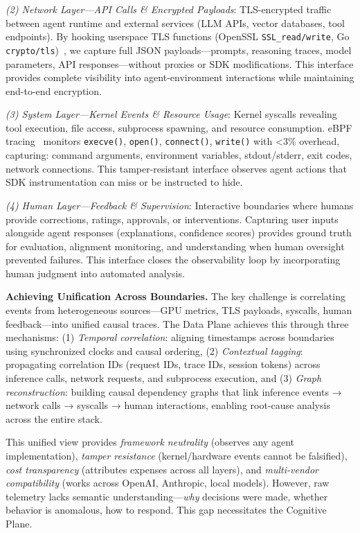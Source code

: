 \documentclass[sigplan,screen,9pt]{acmart}
\begin{document}
\emph{(2) Network Layer—API Calls \& Encrypted Payloads}: TLS-encrypted traffic between agent runtime and external services (LLM APIs, vector databases, tool endpoints). By hooking userspace TLS functions (OpenSSL \texttt{SSL\_read/write}, Go \texttt{crypto/tls})~\cite{zheng2025extending}, we capture full JSON payloads—prompts, reasoning traces, model parameters, API responses—without proxies or SDK modifications. This interface provides complete visibility into agent-environment interactions while maintaining end-to-end encryption.

\emph{(3) System Layer—Kernel Events \& Resource Usage}: Kernel syscalls revealing tool execution, file access, subprocess spawning, and resource consumption. eBPF tracing~\cite{brendangregg,ebpfio} monitors \texttt{execve()}, \texttt{open()}, \texttt{connect()}, \texttt{write()} with <3\% overhead, capturing: command arguments, environment variables, stdout/stderr, exit codes, network connections. This tamper-resistant interface observes agent actions that SDK instrumentation can miss or be instructed to hide.

\emph{(4) Human Layer—Feedback \& Supervision}: Interactive boundaries where humans provide corrections, ratings, approvals, or interventions. Capturing user inputs alongside agent responses (explanations, confidence scores) provides ground truth for evaluation, alignment monitoring, and understanding when human oversight prevented failures. This interface closes the observability loop by incorporating human judgment into automated analysis.

\textbf{Achieving Unification Across Boundaries.} The key challenge is correlating events from heterogeneous sources—GPU metrics, TLS payloads, syscalls, human feedback—into unified causal traces. The Data Plane achieves this through three mechanisms: (1) \emph{Temporal correlation}: aligning timestamps across boundaries using synchronized clocks and causal ordering, (2) \emph{Contextual tagging}: propagating correlation IDs (request IDs, trace IDs, session tokens) across inference calls, network requests, and subprocess execution, and (3) \emph{Graph reconstruction}: building causal dependency graphs that link inference events → network calls → syscalls → human interactions, enabling root-cause analysis across the entire stack.

This unified view provides \emph{framework neutrality} (observes any agent implementation), \emph{tamper resistance} (kernel/hardware events cannot be falsified), \emph{cost transparency} (attributes expenses across all layers), and \emph{multi-vendor compatibility} (works across OpenAI, Anthropic, local models). However, raw telemetry lacks semantic understanding—\emph{why} decisions were made, whether behavior is anomalous, how to respond. This gap necessitates the Cognitive Plane.
\end{document}
